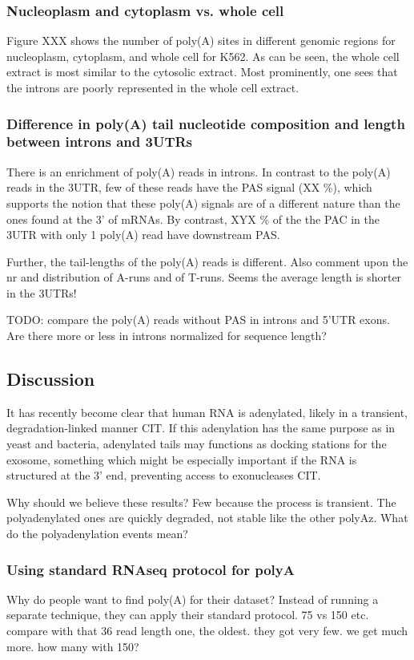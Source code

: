 \documentclass[a4paper]{article}
\begin{document}
\subsubsection{Nucleoplasm and cytoplasm vs. whole cell}
Figure XXX shows the number of poly(A) sites in different genomic regions for
nucleoplasm, cytoplasm, and whole cell for K562. As can be seen, the whole cell
extract is most similar to the cytosolic extract. Most prominently, one sees
that the introns are poorly represented in the whole cell extract.

\subsubsection{Difference in poly(A) tail nucleotide composition and length
between introns and 3UTRs}

There is an enrichment of poly(A) reads in introns. In contrast to the poly(A)
reads in the 3UTR, few of these reads have the PAS signal (XX \%), which
supports the notion that these poly(A) signals are of a different nature than
the ones found at the 3' of mRNAs. By contrast, XYX \% of the the PAC in the
3UTR with only 1 poly(A) read have downstream PAS.

Further, the tail-lengths of the poly(A) reads is different. Also comment upon
the nr and distribution of A-runs and of T-runs. Seems the average length is
shorter in the 3UTRs!

TODO: compare the poly(A) reads without PAS in introns and 5'UTR exons. Are
there more or less in introns normalized for sequence length?

\subsection{Discussion}
It has recently become clear that human RNA is adenylated, likely in a transient,
degradation-linked manner CIT. If this adenylation has the same purpose as in
yeast and bacteria, adenylated tails may functions as docking stations for the
exosome, something which might be especially important if the RNA is structured
at the 3' end, preventing access to exonucleases CIT.

Why should we believe these results? Few because the process is transient.
The polyadenylated ones are quickly degraded, not stable like the other polyAz.
What do the polyadenylation events mean?

\subsubsection{Using standard RNAseq protocol for polyA}

Why do people want to find poly(A) for their dataset?
Instead of running a separate technique, they can apply their standard
protocol. 75 vs 150 etc. compare with that 36 read length one, the oldest. they
got very few. we get much more. how many with 150?




%
\end{document}
